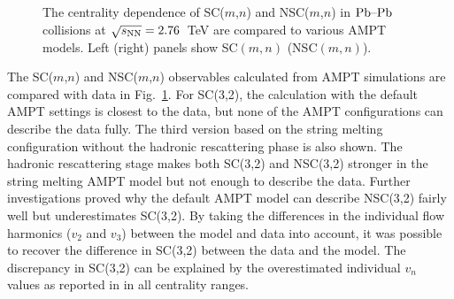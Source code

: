  \begin{figure}[!]
	\begin{center}
        \caption{The centrality dependence of SC($m$,$n$) and NSC($m$,$n$) in $\textnormal{Pb--Pb}$ collisions at $\sqrt{s_{\textnormal{NN}}}=2.76$~TeV are compared to various AMPT models. Left (right) panels show SC$(m,n)$ (NSC$(m,n)$).}
        \label{fig:Figure_5}
        \end{center}   
 \end{figure}
 
The SC($m$,$n$) and NSC($m$,$n$) observables calculated from AMPT simulations are compared with data in Fig.~\ref{fig:Figure_5}.
For SC(3,2), the calculation with the default AMPT settings is closest to the data, but none of the AMPT configurations can describe the data fully. 
The third version based on the string melting configuration without the hadronic rescattering phase is also shown.
The hadronic rescattering stage makes both SC(3,2) and NSC(3,2) stronger in the string melting AMPT model but not enough to describe the data.
Further investigations proved why the default AMPT model can describe NSC(3,2) fairly well but underestimates SC(3,2). By taking the differences in the individual flow harmonics ($v_2$ and $v_3$) between the model and data into account, it was possible to recover the difference in SC(3,2) between the data and the model. The discrepancy in SC(3,2) can be explained by the overestimated individual $v_n$ values as reported in \cite{Adam:2016nfo} in all centrality ranges. 

